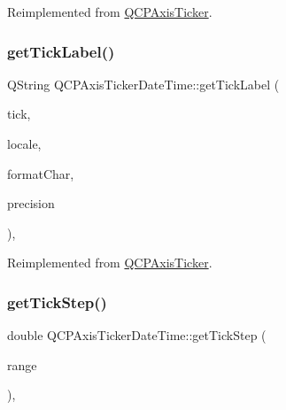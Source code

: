 Reimplemented from \mbox{\hyperlink{class_q_c_p_axis_ticker_a4ccc403ced7a1457ce6ba293509933c8}{Q\+C\+P\+Axis\+Ticker}}.

\mbox{\label{class_q_c_p_axis_ticker_date_time_a4dc6a03f7ea5c619477528a683ed5c18}} 
\subsubsection{\texorpdfstring{getTickLabel()}{getTickLabel()}}
{\footnotesize\ttfamily Q\+String Q\+C\+P\+Axis\+Ticker\+Date\+Time\+::get\+Tick\+Label (\begin{DoxyParamCaption}\item[{double}]{tick,  }\item[{const Q\+Locale \&}]{locale,  }\item[{Q\+Char}]{format\+Char,  }\item[{int}]{precision }\end{DoxyParamCaption})\hspace{0.3cm}{\ttfamily [protected]}, {\ttfamily [virtual]}}



Reimplemented from \mbox{\hyperlink{class_q_c_p_axis_ticker_a8201eb4aa8be192bf786b126eb5ee089}{Q\+C\+P\+Axis\+Ticker}}.

\mbox{\label{class_q_c_p_axis_ticker_date_time_a0560c14a3f87bb99ab136aca8321b32a}} 
\subsubsection{\texorpdfstring{getTickStep()}{getTickStep()}}
{\footnotesize\ttfamily double Q\+C\+P\+Axis\+Ticker\+Date\+Time\+::get\+Tick\+Step (\begin{DoxyParamCaption}\item[{const \mbox{\hyperlink{class_q_c_p_range}{Q\+C\+P\+Range}} \&}]{range }\end{DoxyParamCaption})\hspace{0.3cm}{\ttfamily [protected]}, {\ttfamily [virtual]}}



